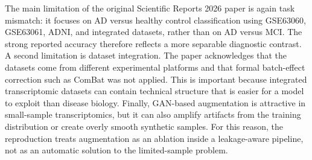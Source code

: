 The main limitation of the original Scientific Reports 2026 paper is again task mismatch: it focuses on AD versus healthy control classification using GSE63060, GSE63061, ADNI, and integrated datasets, rather than on AD versus MCI. The strong reported accuracy therefore reflects a more separable diagnostic contrast. A second limitation is dataset integration. The paper acknowledges that the datasets come from different experimental platforms and that formal batch-effect correction such as ComBat was not applied. This is important because integrated transcriptomic datasets can contain technical structure that is easier for a model to exploit than disease biology. Finally, GAN-based augmentation is attractive in small-sample transcriptomics, but it can also amplify artifacts from the training distribution or create overly smooth synthetic samples. For this reason, the reproduction treats augmentation as an ablation inside a leakage-aware pipeline, not as an automatic solution to the limited-sample problem.
